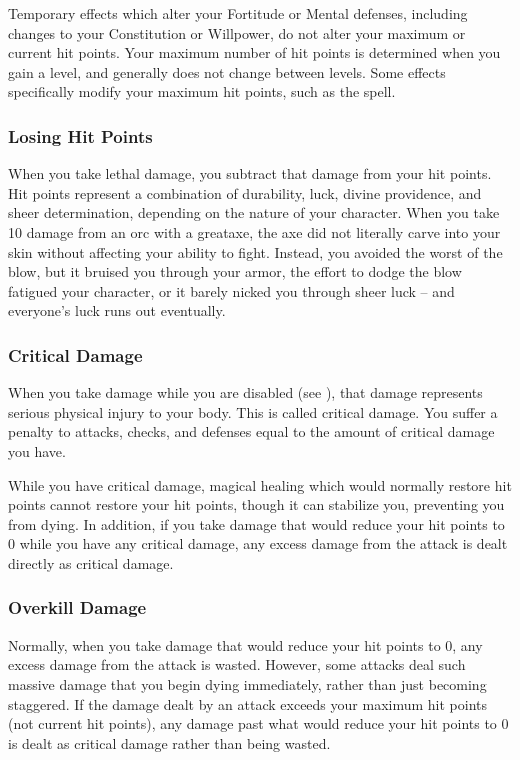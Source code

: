  Temporary effects which alter your Fortitude or Mental defenses, including changes to your Constitution or Willpower, do not alter your maximum or current hit points.
Your maximum number of hit points is determined when you gain a level, and generally does not change between levels.
Some effects specifically modify your maximum hit points, such as the  spell.

\subsubsection{Losing Hit Points}
When you take lethal damage, you subtract that damage from your hit points.
 Hit points represent a combination of durability, luck, divine providence, and sheer determination, depending on the nature of your character.
When you take 10 damage from an orc with a greataxe, the axe did not literally carve into your skin without affecting your ability to fight.
Instead, you avoided the worst of the blow, but it bruised you through your armor, the effort to dodge the blow fatigued your character, or it barely nicked you through sheer luck -- and everyone's luck runs out eventually.

\subsubsection{Critical Damage}\label{Critical Damage}
When you take damage while you are disabled (see ), that damage represents serious physical injury to your body.
This is called critical damage.
You suffer a penalty to attacks, checks, and defenses equal to the amount of critical damage you have.

While you have critical damage, magical healing which would normally restore hit points cannot restore your hit points, though it can stabilize you, preventing you from dying.
In addition, if you take damage that would reduce your hit points to 0 while you have any critical damage, any excess damage from the attack is dealt directly as critical damage.

\subsubsection{Overkill Damage}
Normally, when you take damage that would reduce your hit points to 0, any excess damage from the attack is wasted.
However, some attacks deal such massive damage that you begin dying immediately, rather than just becoming staggered.
If the damage dealt by an attack exceeds your maximum hit points (not current hit points), any damage past what would reduce your hit points to 0 is dealt as critical damage rather than being wasted.

